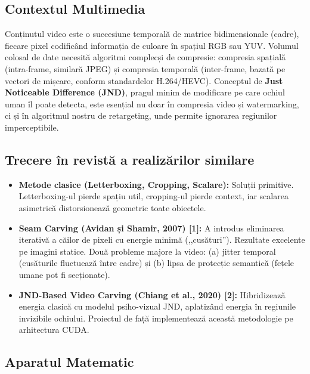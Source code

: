 \documentclass[12pt,a4paper]{article}
\begin{document}
\subsection{Contextul Multimedia}
Conținutul video este o succesiune temporală de matrice bidimensionale (cadre), fiecare pixel codificând informația de culoare în spațiul RGB sau YUV. Volumul colosal de date necesită algoritmi complecși de compresie: compresia spațială (intra-frame, similară JPEG) și compresia temporală (inter-frame, bazată pe vectori de mișcare, conform standardelor H.264/HEVC).
Conceptul de \textbf{Just Noticeable Difference (JND)}, pragul minim de modificare pe care ochiul uman îl poate detecta, este esențial nu doar în compresia video și watermarking, ci și în algoritmul nostru de retargeting, unde permite ignorarea regiunilor imperceptibile.
\subsection{Trecere în revistă a realizărilor similare}
\begin{itemize}[noitemsep]
    \item \textbf{Metode clasice (Letterboxing, Cropping, Scalare):} Soluții primitive. Letterboxing-ul pierde spațiu util, cropping-ul pierde context, iar scalarea asimetrică distorsionează geometric toate obiectele.
    \item \textbf{Seam Carving (Avidan și Shamir, 2007) [1]:} A introdus eliminarea iterativă a căilor de pixeli cu energie minimă (,,cusături''). Rezultate excelente pe imagini statice. Două probleme majore la video: (a) jitter temporal (cusăturile fluctuează între cadre) și (b) lipsa de protecție semantică (fețele umane pot fi secționate).
    \item \textbf{JND-Based Video Carving (Chiang et al., 2020) [2]:} Hibridizează energia clasică cu modelul psiho-vizual JND, aplatizând energia în regiunile invizibile ochiului. Proiectul de față implementează această metodologie pe arhitectura CUDA.
\end{itemize}
\subsection{Aparatul Matematic}
\end{document}
